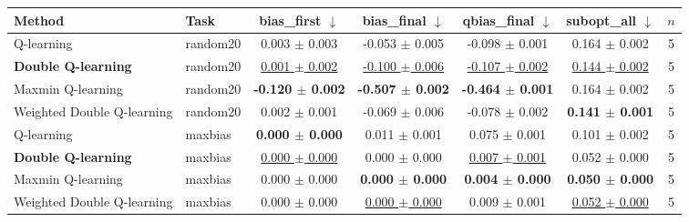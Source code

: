 \begin{tabular}{llccccc}
\toprule
Method & Task & bias\_first $\downarrow$ & bias\_final $\downarrow$ & qbias\_final $\downarrow$ & subopt\_all $\downarrow$ & $n$ \\
\midrule
Q-learning & random20 & 0.003 $\pm$ 0.003 & -0.053 $\pm$ 0.005 & -0.098 $\pm$ 0.001 & 0.164 $\pm$ 0.002 & 5 \\
\textbf{Double Q-learning} & random20 & \underline{0.001 $\pm$ 0.002} & \underline{-0.100 $\pm$ 0.006} & \underline{-0.107 $\pm$ 0.002} & \underline{0.144 $\pm$ 0.002} & 5 \\
Maxmin Q-learning & random20 & \textbf{-0.120 $\pm$ 0.002} & \textbf{-0.507 $\pm$ 0.002} & \textbf{-0.464 $\pm$ 0.001} & 0.164 $\pm$ 0.002 & 5 \\
Weighted Double Q-learning & random20 & 0.002 $\pm$ 0.001 & -0.069 $\pm$ 0.006 & -0.078 $\pm$ 0.002 & \textbf{0.141 $\pm$ 0.001} & 5 \\
\midrule
Q-learning & maxbias & \textbf{0.000 $\pm$ 0.000} & 0.011 $\pm$ 0.001 & 0.075 $\pm$ 0.001 & 0.101 $\pm$ 0.002 & 5 \\
\textbf{Double Q-learning} & maxbias & \underline{0.000 $\pm$ 0.000} & 0.000 $\pm$ 0.000 & \underline{0.007 $\pm$ 0.001} & 0.052 $\pm$ 0.000 & 5 \\
Maxmin Q-learning & maxbias & 0.000 $\pm$ 0.000 & \textbf{0.000 $\pm$ 0.000} & \textbf{0.004 $\pm$ 0.000} & \textbf{0.050 $\pm$ 0.000} & 5 \\
Weighted Double Q-learning & maxbias & 0.000 $\pm$ 0.000 & \underline{0.000 $\pm$ 0.000} & 0.009 $\pm$ 0.001 & \underline{0.052 $\pm$ 0.000} & 5 \\
\bottomrule
\end{tabular}
